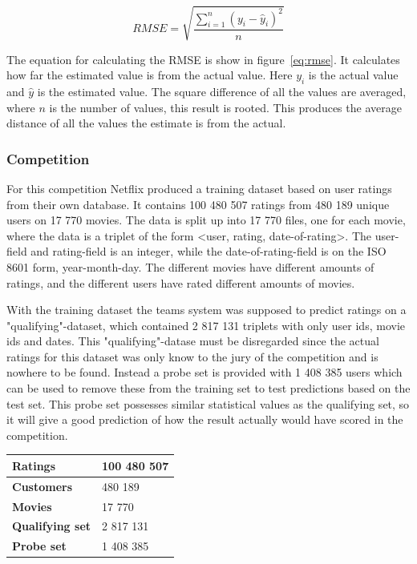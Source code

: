 \begin{equation}\label{eq:rmse}
RMSE = \sqrt {{\frac{{\sum\limits_{{i = 1}}^n {{{\left( {{y_i} - {{\hat{y}}_i}} \right)}^2}} }}{{n}}}}
\end{equation}

The equation for calculating the RMSE is show in figure~\ref{eq:rmse}. It calculates how far the estimated value is from the actual value. Here ${y_i}$ is the actual value and ${\hat{y}}$ is the estimated value. The square difference of all the values are averaged, where ${n}$ is the number of values, this result is rooted. This produces the average distance of all the values the estimate is from the actual.


\subsubsection{Competition}

For this competition Netflix produced a training dataset based on user ratings from their own database. It contains 100 480 507 ratings from 480 189 unique users on 17 770 movies. The data is split up into 17 770 files, one for each movie, where the data is a triplet of the form <user, rating, date-of-rating>. The user-field and rating-field is an integer, while the date-of-rating-field is on the ISO 8601 form, year-month-day. The different movies have different amounts of ratings, and the different users have rated different amounts of movies.

With the training dataset the teams system was supposed to predict ratings on a "qualifying"-dataset, which contained 2 817 131 triplets with only user ids, movie ids and dates. This "qualifying"-datase must be disregarded since the actual ratings for this dataset was only know to the jury of the competition and is nowhere to be found. Instead a probe set is provided with 1 408 385 users which can be used to remove these from the training set to test predictions based on the test set. This probe set possesses similar statistical values as the qualifying set, so it will give a good prediction of how the result actually would have scored in the competition.

\begin{center}
\begin{tabularx}{\textwidth}{ l X }
\hline
\textbf{Ratings} & 100 480 507 \\ \hline
\textbf{Customers} & 480 189 \\ \hline
\textbf{Movies} & 17 770 \\ \hline
\textbf{Qualifying set} & 2 817 131 \\ \hline
\textbf{Probe set} & 1 408 385 \\ \hline
\end{tabularx}
\label{tab:nfDatasetStat}
\end{center}


